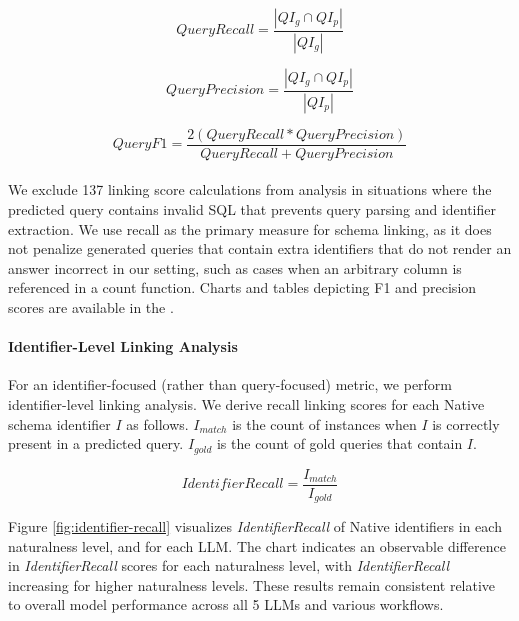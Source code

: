 \begin{equation}
  \label{eq:recall}
  QueryRecall = \frac{|QI_g \cap QI_p|}{|QI_g|}
\end{equation}

\begin{equation}
  \label{eq:precision}
  QueryPrecision = \frac{|QI_g \cap QI_p|}{|QI_p|}
\end{equation}

\begin{equation}
  \label{eq:f1}
  QueryF1 = \frac{2(QueryRecall*QueryPrecision)}{QueryRecall+QueryPrecision}
\end{equation}
\\
We exclude 137 linking score calculations from analysis in situations where the predicted query contains invalid SQL that prevents query parsing and identifier extraction.
We use recall as the primary measure for schema linking, as it does not penalize generated queries that contain extra identifiers that do not render an answer incorrect in our setting, such as cases when an arbitrary column is referenced in a count function.
Charts and tables depicting F1 and precision scores are available in the \fi.

\paragraph{\textbf{Identifier-Level Linking Analysis}}

For an identifier-focused (rather than query-focused) metric, we perform identifier-level linking analysis.
We derive recall linking scores for each Native schema identifier $I$ as follows. 
$I_{match}$ is the count of instances when $I$ is correctly present in a predicted query. 
$I_{gold}$ is the count of gold queries that contain $I$.

\begin{equation}
  \label{eq:identifier-recall}
  IdentifierRecall = \frac{I_{match}}{I_{gold}}
\end{equation}

Figure \ref{fig:identifier-recall} visualizes \emph{IdentifierRecall} of Native identifiers in each naturalness level, and for each LLM.
The chart indicates an observable difference in \emph{IdentifierRecall} scores for each naturalness level, with \emph{IdentifierRecall} increasing for higher naturalness levels.
These results remain consistent relative to overall model performance across all 5 LLMs and various workflows.

